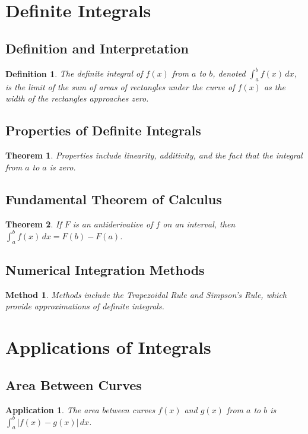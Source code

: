 \documentclass[a4paper,12pt]{book}
\newtheorem{theorem}{Theorem}
\newtheorem{application}{Application}
\newtheorem{definition}{Definition}
\newtheorem{method}{Method}
\begin{document}
\section{Definite Integrals}
\subsection{Definition and Interpretation}
\begin{definition}
The definite integral of \( f(x) \) from \( a \) to \( b \), denoted \( \int_a^b f(x) \, dx \), is the limit of the sum of areas of rectangles under the curve of \( f(x) \) as the width of the rectangles approaches zero.
\end{definition}

\subsection{Properties of Definite Integrals}
\begin{theorem}
Properties include linearity, additivity, and the fact that the integral from \( a \) to \( a \) is zero.
\end{theorem}

\subsection{Fundamental Theorem of Calculus}
\begin{theorem}
If \( F \) is an antiderivative of \( f \) on an interval, then \( \int_a^b f(x) \, dx = F(b) - F(a) \).
\end{theorem}

\subsection{Numerical Integration Methods}
\begin{method}
Methods include the Trapezoidal Rule and Simpson's Rule, which provide approximations of definite integrals.
\end{method}

\section{Applications of Integrals}
\subsection{Area Between Curves}
\begin{application}
The area between curves \( f(x) \) and \( g(x) \) from \( a \) to \( b \) is \( \int_a^b |f(x) - g(x)| \, dx \).
\end{application}
\end{document}
